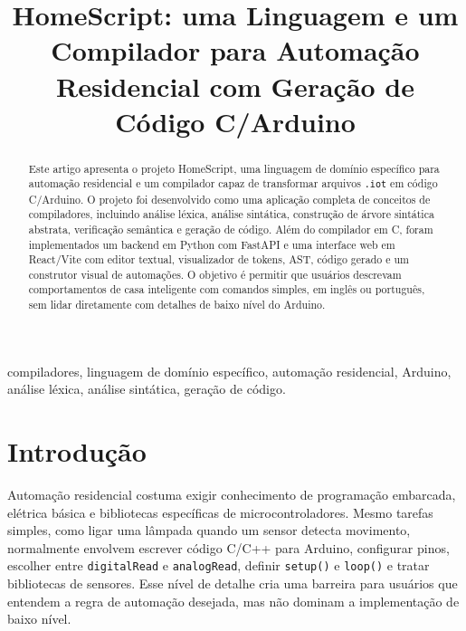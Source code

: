 \documentclass[conference]{IEEEtran}
\begin{document}
\title{HomeScript: uma Linguagem e um Compilador para Automação Residencial com Geração de Código C/Arduino}

\author{
}

\maketitle

\begin{abstract}
Este artigo apresenta o projeto HomeScript, uma linguagem de domínio específico para automação residencial e um compilador capaz de transformar arquivos \texttt{.iot} em código C/Arduino. O projeto foi desenvolvido como uma aplicação completa de conceitos de compiladores, incluindo análise léxica, análise sintática, construção de árvore sintática abstrata, verificação semântica e geração de código. Além do compilador em C, foram implementados um backend em Python com FastAPI e uma interface web em React/Vite com editor textual, visualizador de tokens, AST, código gerado e um construtor visual de automações. O objetivo é permitir que usuários descrevam comportamentos de casa inteligente com comandos simples, em inglês ou português, sem lidar diretamente com detalhes de baixo nível do Arduino.
\end{abstract}

\begin{IEEEkeywords}
compiladores, linguagem de domínio específico, automação residencial, Arduino, análise léxica, análise sintática, geração de código.
\end{IEEEkeywords}

\section{Introdução}
Automação residencial costuma exigir conhecimento de programação embarcada, elétrica básica e bibliotecas específicas de microcontroladores. Mesmo tarefas simples, como ligar uma lâmpada quando um sensor detecta movimento, normalmente envolvem escrever código C/C++ para Arduino, configurar pinos, escolher entre \texttt{digitalRead} e \texttt{analogRead}, definir \texttt{setup()} e \texttt{loop()} e tratar bibliotecas de sensores. Esse nível de detalhe cria uma barreira para usuários que entendem a regra de automação desejada, mas não dominam a implementação de baixo nível.
\end{document}
